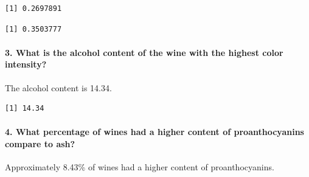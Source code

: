 \documentclass[
  letterpaper,
  DIV=11,
  numbers=noendperiod]{scrartcl}
\let\oldparagraph\paragraph
\renewcommand{\paragraph}[1]{\oldparagraph{#1}\mbox{}}
\newenvironment{Shaded}{\begin{snugshade}}{\end{snugshade}}
\newcommand{\CommentTok}[1]{\textcolor[rgb]{0.37,0.37,0.37}{#1}}
\newcommand{\DecValTok}[1]{\textcolor[rgb]{0.68,0.00,0.00}{#1}}
\newcommand{\FunctionTok}[1]{\textcolor[rgb]{0.28,0.35,0.67}{#1}}
\newcommand{\NormalTok}[1]{\textcolor[rgb]{0.00,0.23,0.31}{#1}}
\newcommand{\OtherTok}[1]{\textcolor[rgb]{0.00,0.23,0.31}{#1}}
\newcommand{\SpecialCharTok}[1]{\textcolor[rgb]{0.37,0.37,0.37}{#1}}
\begin{document}
\begin{verbatim}
[1] 0.2697891
\end{verbatim}

\begin{Shaded}
\end{Shaded}

\begin{verbatim}
[1] 0.3503777
\end{verbatim}

\paragraph{3. What is the alcohol content of the wine with the highest
color
intensity?}\label{what-is-the-alcohol-content-of-the-wine-with-the-highest-color-intensity}

The alcohol content is 14.34.

\begin{Shaded}
\end{Shaded}

\begin{verbatim}
[1] 14.34
\end{verbatim}

\paragraph{4. What percentage of wines had a higher content of
proanthocyanins compare to
ash?}\label{what-percentage-of-wines-had-a-higher-content-of-proanthocyanins-compare-to-ash}

Approximately 8.43\% of wines had a higher content of proanthocyanins.

\begin{Shaded}
\end{Shaded}
\end{document}
